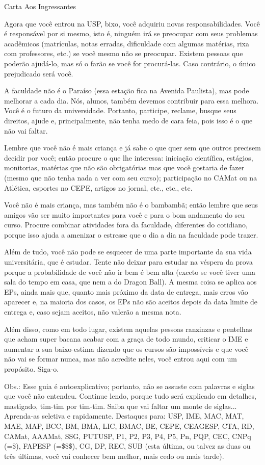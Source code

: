 \begin{secao}{Carta Aos Ingressantes}

Agora que você entrou na USP, bixo, você adquiriu novas responsabilidades.
Você é responsável por si mesmo, isto é, ninguém irá se preocupar com seus
problemas acadêmicos (matrículas, notas erradas, dificuldade com algumas
matérias, rixa com professores, etc.) se você mesmo não se preocupar. Existem
pessoas que poderão ajudá-lo, mas só o farão se você for procurá-las. Caso
contrário, o único prejudicado será você.

A faculdade não é o Paraíso (essa estação fica na Avenida Paulista), mas pode
melhorar a cada dia. Nós, alunos, também devemos contribuir para essa melhora.
Você é o futuro da universidade. Portanto, participe, reclame, busque seus
direitos, ajude e, principalmente, não tenha medo de cara feia, pois isso é o
que não vai faltar. 

Lembre que você não é mais criança e já sabe o que quer sem que outros precisem decidir por você; então procure o que lhe interessa: iniciação científica,
estágios, monitorias, matérias que não são obrigatórias mas que você gostaria
de fazer (mesmo que não tenha nada a ver com seu curso); participação no
CAMat ou na Atlética, esportes no CEPE, artigos no jornal, etc., etc., etc.

Você não é mais criança, mas também não é o bambambã; então lembre que
seus amigos vão ser muito importantes para você e para o bom andamento do seu
curso. Procure combinar atividades fora da faculdade, diferentes do cotidiano,
porque isso ajuda a amenizar o estresse que o dia a dia na faculdade pode trazer.

Além de tudo, você não pode se esquecer de uma parte importante da sua vida
universitária, que é estudar. Tente não deixar para estudar na véspera da prova
porque a probabilidade de você não ir bem é bem alta (exceto se você tiver
uma sala do tempo em casa, que nem a do Dragon Ball). A mesma coisa se aplica aos EPs,
ainda mais que, quanto mais próximo da data de entrega, mais erros vão aparecer
e, na maioria dos casos, os EPs não são aceitos depois da data limite de entrega
e, caso sejam aceitos, não valerão a mesma nota.

Além disso, como em todo lugar, existem aquelas pessoas ranzinzas e pentelhas
que acham super bacana acabar com a graça de todo mundo, criticar o IME e aumentar
a sua baixo-estima dizendo que os cursos são impossíveis e que
você não vai se formar nunca, mas não acredite neles, você entrou aqui com um
propósito. Siga-o.

Obs.: Esse guia é autoexplicativo; portanto, não se assuste com palavras e siglas
que você não entendeu. Continue lendo, porque tudo será explicado em detalhes,
mastigado, tim-tim por tim-tim. Saiba que vai faltar um monte de siglas...
Aprenda-as seletiva e rapidamente. Destaques para: USP, IME, MAC, MAT, MAE, MAP,
BCC, BM, BMA, LIC, BMAC, BE, CEPE, CEAGESP, CTA, RD, CAMat, AAAMat, SSG, PUTUSP,
P1, P2, P3, P4, P5, Pn, PQP, CEC, CNPq (=\$), FAPESP (=\$\$\$), CG, DP, REC, SUB
(esta última, ou talvez as duas ou três últimas, você vai conhecer bem melhor, mais cedo ou mais tarde).

\end{secao}
